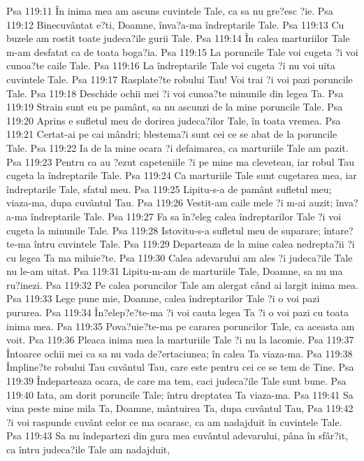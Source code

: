 Psa 119:11  În inima mea am ascuns cuvintele Tale, ca sa nu gre?esc ?ie.
Psa 119:12  Binecuvântat e?ti, Doamne, înva?a-ma îndreptarile Tale.
Psa 119:13  Cu buzele am rostit toate judeca?ile gurii Tale.
Psa 119:14  În calea marturiilor Tale m-am desfatat ca de toata boga?ia.
Psa 119:15  La poruncile Tale voi cugeta ?i voi cunoa?te caile Tale.
Psa 119:16  La îndreptarile Tale voi cugeta ?i nu voi uita cuvintele Tale.
Psa 119:17  Rasplate?te robului Tau! Voi trai ?i voi pazi poruncile Tale.
Psa 119:18  Deschide ochii mei ?i voi cunoa?te minunile din legea Ta.
Psa 119:19  Strain sunt eu pe pamânt, sa nu ascunzi de la mine poruncile Tale.
Psa 119:20  Aprins e sufletul meu de dorirea judeca?ilor Tale, în toata vremea.
Psa 119:21  Certat-ai pe cai mândri; blestema?i sunt cei ce se abat de la poruncile Tale.
Psa 119:22  Ia de la mine ocara ?i defaimarea, ca marturiile Tale am pazit.
Psa 119:23  Pentru ca au ?ezut capeteniile ?i pe mine ma cleveteau, iar robul Tau cugeta la îndreptarile Tale.
Psa 119:24  Ca marturiile Tale sunt cugetarea mea, iar îndreptarile Tale, sfatul meu.
Psa 119:25  Lipitu-s-a de pamânt sufletul meu; viaza-ma, dupa cuvântul Tau.
Psa 119:26  Vestit-am caile mele ?i m-ai auzit; înva?a-ma îndreptarile Tale.
Psa 119:27  Fa sa în?eleg calea îndreptarilor Tale ?i voi cugeta la minunile Tale.
Psa 119:28  Istovitu-s-a sufletul meu de suparare; întare?te-ma întru cuvintele Tale.
Psa 119:29  Departeaza de la mine calea nedrepta?ii ?i cu legea Ta ma miluie?te.
Psa 119:30  Calea adevarului am ales ?i judeca?ile Tale nu le-am uitat.
Psa 119:31  Lipitu-m-am de marturiile Tale, Doamne, sa nu ma ru?inezi.
Psa 119:32  Pe calea poruncilor Tale am alergat când ai largit inima mea.
Psa 119:33  Lege pune mie, Doamne, calea îndreptarilor Tale ?i o voi pazi pururea.
Psa 119:34  În?elep?e?te-ma ?i voi cauta legea Ta ?i o voi pazi cu toata inima mea.
Psa 119:35  Pova?uie?te-ma pe cararea poruncilor Tale, ca aceasta am voit.
Psa 119:36  Pleaca inima mea la marturiile Tale ?i nu la lacomie.
Psa 119:37  Întoarce ochii mei ca sa nu vada de?ertaciunea; în calea Ta viaza-ma.
Psa 119:38  Împline?te robului Tau cuvântul Tau, care este pentru cei ce se tem de Tine.
Psa 119:39  Îndeparteaza ocara, de care ma tem, caci judeca?ile Tale sunt bune.
Psa 119:40  Iata, am dorit poruncile Tale; întru dreptatea Ta viaza-ma.
Psa 119:41  Sa vina peste mine mila Ta, Doamne, mântuirea Ta, dupa cuvântul Tau,
Psa 119:42  ?i voi raspunde cuvânt celor ce ma ocarasc, ca am nadajduit în cuvintele Tale.
Psa 119:43  Sa nu îndepartezi din gura mea cuvântul adevarului, pâna în sfâr?it, ca întru judeca?ile Tale am nadajduit,

